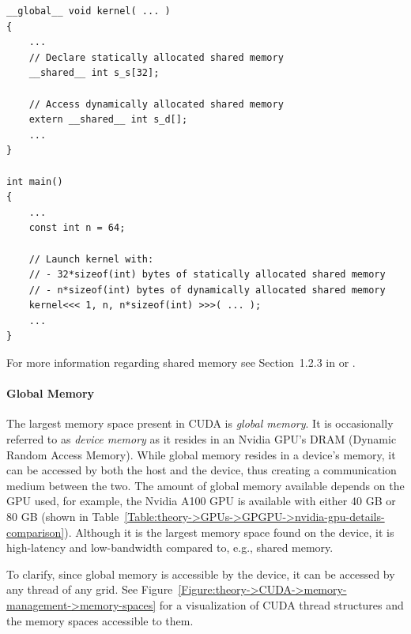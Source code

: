 \begin{lstlisting}[caption={Excerpt of C++ code showcasing the syntax of static and dynamic shared memory allocation.
Note when an array in shared memory is declared using \code{extern}, then the size of the array is determined at run time \cite{NVIDIADecember2022}.
Taken from \citetitle{Harris28January2013} by \citename{Harris28January2013}{author} \cite{Harris28January2013}.},label={Listing:theory->CUDA->memory-management->statically-allocated-shared-memory-example}]
__global__ void kernel( ... )
{
	...
	// Declare statically allocated shared memory
	__shared__ int s_s[32];

	// Access dynamically allocated shared memory
	extern __shared__ int s_d[];
	...
}

int main()
{
	...
	const int n = 64;
	
	// Launch kernel with:
	// - 32*sizeof(int) bytes of statically allocated shared memory
	// - n*sizeof(int) bytes of dynamically allocated shared memory
	kernel<<< 1, n, n*sizeof(int) >>>( ... );
	...
}
\end{lstlisting}

For more information regarding shared memory see Section~1.2.3 in  \cite{Cejka2022} or  \cite{NVIDIADecember2022}.

\paragraph{Global Memory} The largest memory space present in CUDA is \textit{global memory}.
It is occasionally referred to as \textit{device memory} as it resides in an Nvidia GPU's DRAM (Dynamic Random Access Memory).
While global memory resides in a device's memory, it can be accessed by both the host and the device, thus creating a communication medium between the two.
The amount of global memory available depends on the GPU used, for example, the Nvidia A100 GPU is available with either 40 GB or 80 GB (shown in Table~\ref{Table:theory->GPUs->GPGPU->nvidia-gpu-details-comparison}).
Although it is the largest memory space found on the device, it is high-latency and low-bandwidth compared to, e.g., shared memory.

To clarify, since global memory is accessible by the device, it can be accessed by any thread of any grid.
See Figure~\ref{Figure:theory->CUDA->memory-management->memory-spaces} for a visualization of CUDA thread structures and the memory spaces accessible to them.

